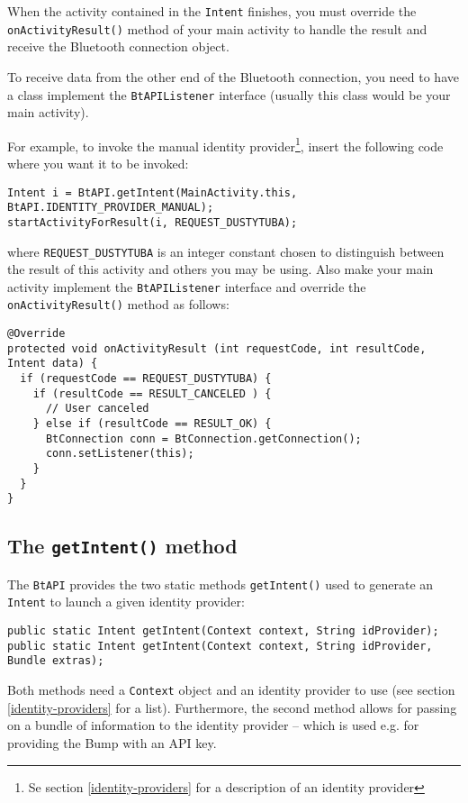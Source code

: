 \documentclass[a4paper,11pt]{article}
\begin{document}
When the activity contained in the \verb+Intent+ finishes, you must override the \verb+onActivityResult()+ method of your main activity to handle the result and receive the Bluetooth connection object.

To receive data from the other end of the Bluetooth connection, you need to have a class implement the \verb+BtAPIListener+ interface (usually this class would be your main activity).

For example, to invoke the manual identity provider\footnote{Se section \ref{identity-providers} for a description of an identity provider}, insert the following code where you want it to be invoked:

\footnotesize
\begin{verbatim}
Intent i = BtAPI.getIntent(MainActivity.this, BtAPI.IDENTITY_PROVIDER_MANUAL);
startActivityForResult(i, REQUEST_DUSTYTUBA);
\end{verbatim}
\normalsize

where \verb+REQUEST_DUSTYTUBA+ is an integer constant chosen to distinguish between the result of this activity and others you may be using. Also make your main activity implement the \verb+BtAPIListener+ interface and override the \verb+onActivityResult()+ method as follows:

\footnotesize
\begin{verbatim}
@Override
protected void onActivityResult (int requestCode, int resultCode, Intent data) {
  if (requestCode == REQUEST_DUSTYTUBA) {
    if (resultCode == RESULT_CANCELED ) {
      // User canceled
    } else if (resultCode == RESULT_OK) {
      BtConnection conn = BtConnection.getConnection(); 
      conn.setListener(this);
    }
  }
}
\end{verbatim}
\normalsize

\subsection{The {\tt getIntent()} method}
\label{getIntent}
The \verb+BtAPI+ provides the two static methods \verb+getIntent()+ used to generate an \verb+Intent+ to launch a given identity provider:

\footnotesize
\begin{verbatim}
public static Intent getIntent(Context context, String idProvider);
public static Intent getIntent(Context context, String idProvider, Bundle extras);
\end{verbatim}
\normalsize

Both methods need a \verb+Context+ object and an identity provider to use (see section \ref{identity-providers} for a list). Furthermore, the second method allows for passing on a bundle of information to the identity provider -- which is used e.g. for providing the Bump\texttrademark{} with an API key.
\end{document}
